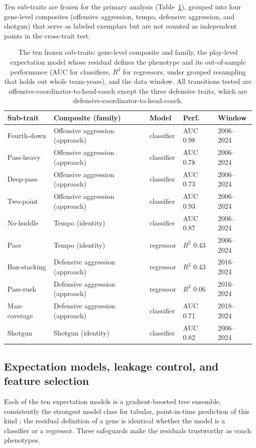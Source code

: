 \documentclass[11pt]{article}
\begin{document}
Ten sub-traits are frozen for the primary analysis (Table~\ref{tab:traits}),
grouped into four gene-level composites (offensive aggression, tempo, defensive
aggression, and shotgun) that serve as labeled exemplars but are not counted as
independent points in the cross-trait test.

\begin{table}[t]
\centering
\caption{The ten frozen sub-traits: gene-level composite and family, the play-level
expectation model whose residual defines the phenotype and its out-of-sample
performance (AUC for classifiers, $R^2$ for regressors, under grouped resampling
that holds out whole team-years), and the data window. All transitions tested are
offensive-coordinator-to-head-coach except the three defensive traits, which are
defensive-coordinator-to-head-coach.}
\label{tab:traits}
\begin{tabular}{lllll}
\toprule
Sub-trait & Composite (family) & Model & Perf. & Window \\
\midrule
Fourth-down  & Offensive aggression (approach) & classifier & AUC 0.98 & 2006--2024 \\
Pass-heavy   & Offensive aggression (approach) & classifier & AUC 0.78 & 2006--2024 \\
Deep-pass    & Offensive aggression (approach) & classifier & AUC 0.73 & 2006--2024 \\
Two-point    & Offensive aggression (approach) & classifier & AUC 0.93 & 2006--2024 \\
No-huddle    & Tempo (identity)                & classifier & AUC 0.87 & 2006--2024 \\
Pace         & Tempo (identity)                & regressor  & $R^2$ 0.43 & 2006--2024 \\
Box-stacking & Defensive aggression (approach) & regressor  & $R^2$ 0.43 & 2016--2024 \\
Pass-rush    & Defensive aggression (approach) & regressor  & $R^2$ 0.06 & 2016--2024 \\
Man-coverage & Defensive aggression (approach) & classifier & AUC 0.71 & 2018--2024 \\
Shotgun      & Shotgun (identity)              & classifier & AUC 0.82 & 2006--2024 \\
\bottomrule
\end{tabular}
\end{table}

\subsection{Expectation models, leakage control, and feature selection}
Each of the ten expectation models is a gradient-boosted tree ensemble, consistently
the strongest model class for tabular, point-in-time prediction of this kind
\citep{chen2016}; the residual definition of a gene is identical whether the model
is a classifier or a regressor. Three safeguards make the residuals trustworthy as
coach phenotypes.
\end{document}
